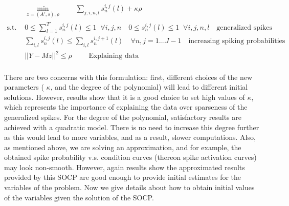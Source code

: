 \documentclass[12pt,letterpaper,fleqn]{article}
\begin{document}
  \begin{eqnarray}& \displaystyle{\min_{z=(A',s),\rho}\quad \quad  \sum_{j,i,n,l} s_n^{i,j}(l)+\kappa \rho} \\ \nonumber
  \text{s.t. } & 0\leq\sum_{l=1}^{T'} s_n^{i,j}(l)\leq 1\;\;\forall i,j,n\quad 0\leq s_n^{i,j}(l)\leq 1\;\; \forall i,j,n,l \quad \text{generalized spikes}\\ \nonumber
  & \sum_{i,l}s_n^{i,j}(l) \leq \sum_{i,l}s_n^{i,j+1}(l)\quad \forall n, j=1\ldots J-1 \quad \text{increasing spiking probabilities}\\ \nonumber 
  & ||Y-Mz||^2\leq \rho \quad \quad \text{ Explaining data} \\ \nonumber
\end{eqnarray}
 
There are two concerns with this formulation: first, different choices of the new parameters ( $\kappa$, and the degree of the polynomial) will lead to different initial solutions. However, results show that it is a good choice to set high values of $\kappa$, which represents the importance of explaining the data over sparseness of the generalized spikes. For the degree of the polynomial, satisfactory results are achieved with a quadratic model. There is no need to increase this degree further as this would lead to more variables, and as a result, slower computations. Also, as mentioned above, we are solving an approximation,  and for example, the obtained spike probability v.s. condition curves (thereon spike activation curves) may look non-smooth. However, again results show the approximated results provided by this SOCP are good enough to provide initial estimates for the variables of the problem. Now we give details about how to obtain initial values of the variables given the solution of the SOCP. \\
\end{document}
